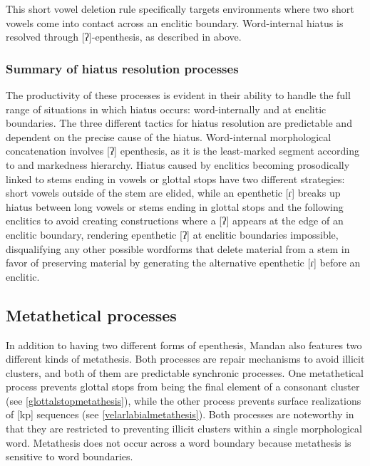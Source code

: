 This short vowel deletion rule specifically targets environments where two short vowels come into contact across an enclitic boundary. Word-internal hiatus is resolved through [ʔ]-epenthesis, as described in  above.

\subsubsection{Summary of hiatus resolution processes}\label{SubsubsecSummaryofHiatusResolutionProcesses}

The productivity of these processes is evident in their ability to handle the full range of situations in which hiatus occurs: word-internally and at enclitic boundaries. The three different tactics for hiatus resolution are predictable and dependent on the precise cause of the hiatus. Word-internal morphological concatenation involves [ʔ] epenthesis, as it is the least-marked segment according to \citet{princesmolensky1993} and  markedness hierarchy. Hiatus caused by enclitics becoming prosodically linked to stems ending in vowels or glottal stops have two different strategies: short vowels outside of the stem are elided, while an epenthetic [ɾ] breaks up hiatus between long vowels or stems ending in glottal stops and the following enclitics to avoid creating constructions where a [ʔ] appears at the edge of an enclitic boundary, rendering epenthetic [ʔ] at enclitic boundaries impossible, disqualifying any other possible wordforms that delete material from a stem in favor of preserving material by generating the alternative epenthetic [ɾ] before an enclitic.



\subsection{Metathetical processes}\label{metathesis}

In addition to having two different forms of epenthesis, Mandan also features two different kinds of metathesis. Both processes are repair mechanisms to avoid illicit clusters, and both of them are predictable synchronic processes. One metathetical process prevents glottal stops from being the final element of a consonant cluster (see \ref{glottalstopmetathesis}), while the other process prevents surface realizations of [kp] sequences (see \ref{velarlabialmetathesis}). Both processes are noteworthy in that they are restricted to preventing illicit clusters within a single morphological word. Metathesis does not occur across a word boundary because metathesis is sensitive to word boundaries.


